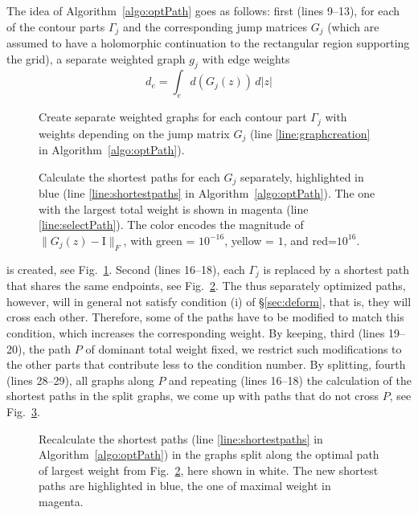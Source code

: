 \documentclass[reqno]{amsart}
\newcommand{\I}{\mathrm{I}}
\begin{document}
The idea of Algorithm~\ref{algo:optPath} goes as follows: first (lines 9--13), for each of the contour parts
$\Gamma_j$ and the corresponding jump matrices $G_j$ (which are assumed to have a holomorphic continuation
to the rectangular region supporting the grid), a separate weighted graph $g_j$ with edge weights 
\[
d_e = \int_e d(G_j(z))\, d|z|
\]
%
\begin{figure}[tbp]
	\caption{Create separate weighted graphs for each contour part $\Gamma_j$ with weights depending on the
	jump matrix $G_j$ (line \ref{line:graphcreation} in Algorithm~\ref{algo:optPath}).}\label{fig:separate}
\end{figure}%
%
\begin{figure}[tbp]
	\caption{Calculate the shortest paths for each $G_j$ separately, highlighted in blue (line \ref{line:shortestpaths}
	in Algorithm~\ref{algo:optPath}). The one with the largest total weight is shown in magenta (line \ref{line:selectPath}). The color encodes the magnitude of $\|G_j(z)-\I\|_F$, with green = $10^{-16}$, yellow = $1$, and red=$10^{16}$.}\label{fig:firstStep}
\end{figure}%
%
is created, see Fig.~\ref{fig:separate}. Second (lines 16--18), each $\Gamma_j$ is replaced by a shortest path
that shares the same endpoints, see Fig.~\ref{fig:firstStep}. The thus separately optimized paths, however, will in general not satisfy condition (i) of §\ref{sec:deform}, that is,
they will cross each other. Therefore, some of the paths have to be modified to match this condition, which increases
the corresponding weight. By keeping, third (lines 19--20), the path $P$ of dominant total weight fixed, we restrict such
modifications to the other parts that contribute less to the condition number. By splitting, fourth (lines 28--29),
all graphs along $P$ and repeating (lines 16--18) the calculation of the shortest paths in the split graphs,
we come up with paths that do not cross $P$, see Fig.~\ref{fig:secondStep}. 

\begin{figure}[tbp]
	\caption{Recalculate the shortest paths (line \ref{line:shortestpaths} in Algorithm~\ref{algo:optPath}) in the
	graphs split along the optimal path of largest weight from Fig.~\ref{fig:firstStep}, here shown in white. The new
	shortest paths are highlighted in blue, the one of maximal weight in magenta.}\label{fig:secondStep}
\end{figure}
\end{document}
